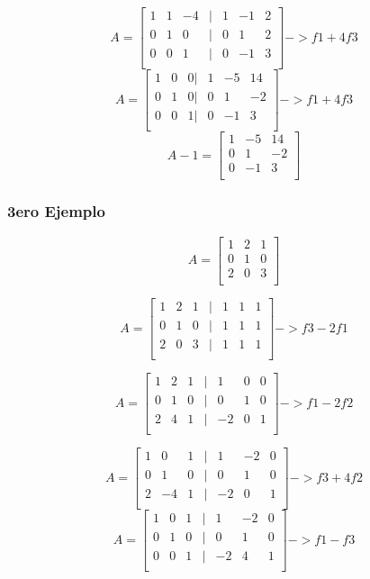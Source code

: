 \documentclass{article}
\begin{document}
\[
    A =
    \begin{bmatrix}
     1 & 1 & -4 & |& 1 & -1 & 2 \\
     0 & 1 & 0  &| &0 & 1 & 2 \\
     0 & 0 & 1  &| &0 & -1 & 3 \\
    \end{bmatrix}
    -> f1+ 4f3
\]
\[
    A =
    \begin{bmatrix}
     1 & 0 & 0 |& 1 & -5 & 14 \\
     0 & 1 & 0 |& 0 & 1 & -2 \\
     0 & 0 & 1 |& 0 & -1 & 3 \\
    \end{bmatrix}
    -> f1+ 4f3
\]
\[
    A-1 =
    \begin{bmatrix}
      1 & -5 & 14 \\
      0 & 1 & -2 \\
      0 & -1 & 3 \\
    \end{bmatrix}
\]



\subsubsection{3ero Ejemplo}

\[
    A =
    \begin{bmatrix}
        1 & 2 & 1 \\
        0 & 1 & 0 \\
        2 & 0 & 3 \\
    \end{bmatrix}
\]

\[
    A =
    \begin{bmatrix}
        1 & 2 & 1 & | & 1 & 1 & 1 \\
        0 & 1 & 0 & | & 1 & 1 & 1 \\
        2 & 0 & 3 & | & 1 & 1 & 1 \\
    \end{bmatrix}
    -> f3-2f1
\]

\[
    A =
    \begin{bmatrix}
        1 & 2 & 1 & | & 1 & 0 & 0 \\
        0 & 1 & 0 & | & 0 & 1 & 0 \\
        2 & 4 & 1 & | & -2 & 0 & 1 \\
    \end{bmatrix}
    -> f1-2f2
\]

\[
    A =
    \begin{bmatrix}
        1 & 0 & 1 & | & 1 & -2 & 0 \\
        0 & 1 & 0 & | & 0 & 1 & 0 \\
        2 & -4 & 1 & | & -2 & 0 & 1 \\
    \end{bmatrix}
    -> f3+4f2
\]
\[
    A =
    \begin{bmatrix}
        1 & 0 & 1 & | & 1 & -2 & 0 \\
        0 & 1 & 0 & | & 0 & 1 & 0 \\
        0 & 0 & 1 & | & -2 & 4 & 1 \\
    \end{bmatrix}
    -> f1-f3
\]
\end{document}
